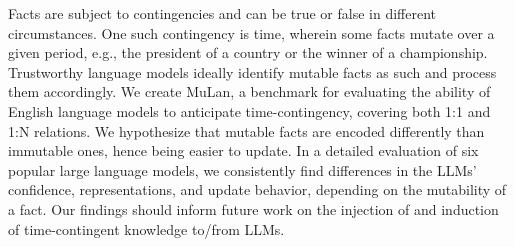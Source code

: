 Facts are subject to contingencies and can be true or false in different circumstances. One such contingency is time, wherein some facts mutate over a given period, e.g., the president of a country or the winner of a championship. Trustworthy language models ideally identify mutable facts as such and process them accordingly. We create MuLan, a benchmark for evaluating the ability of English language models to anticipate time-contingency, covering both 1:1 and 1:N relations. We hypothesize that mutable facts are encoded differently than immutable ones, hence being easier to update. In a detailed evaluation of six popular large language models, we consistently find differences in the LLMs' confidence, representations, and update behavior, depending on the mutability of a fact. Our findings should inform future work on the injection of and induction of time-contingent knowledge to/from LLMs.